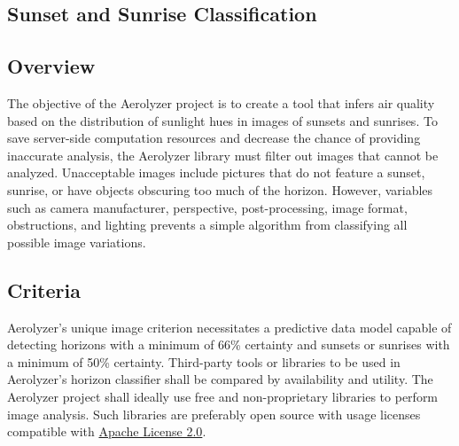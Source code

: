 \documentclass[onecolumn, draftclsnofoot,10pt, compsoc]{IEEEtran}
\begin{document}
\begin{singlespace}

\section{Sunset and Sunrise Classification}
	\subsection{Overview}
		The objective of the Aerolyzer project is to create a tool that infers air quality based on the distribution of sunlight hues in images of sunsets and sunrises.
		To save server-side computation resources and decrease the chance of providing inaccurate analysis, the Aerolyzer library must filter out images that cannot be analyzed.
		Unacceptable images include pictures that do not feature a sunset, sunrise, or have objects obscuring too much of the horizon.
		However, variables such as camera manufacturer, perspective, post-processing, image format, obstructions, and lighting prevents a simple algorithm from classifying all possible image variations.
	
	\subsection{Criteria}
		Aerolyzer’s unique image criterion necessitates a predictive data model capable of detecting horizons with a minimum of 66\% certainty and sunsets or sunrises with a minimum of 50\% certainty.
		Third-party tools or libraries to be used in Aerolyzer’s horizon classifier shall be compared by availability and utility.
		The Aerolyzer project shall ideally use free and non-proprietary libraries to perform image analysis.
		Such libraries are preferably open source with usage licenses compatible with \href{https://www.apache.org/licenses/LICENSE-2.0}{Apache License 2.0}.




\end{singlespace}
\end{document}
